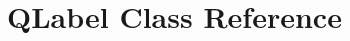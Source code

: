 \hypertarget{classGUI_1_1QtGui_1_1QLabel}{}\section{Q\+Label Class Reference}
\label{classGUI_1_1QtGui_1_1QLabel}
